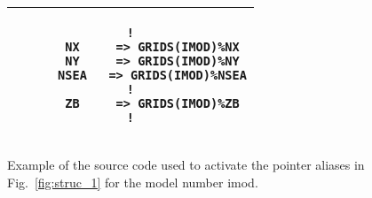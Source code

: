 \begin{figure}
\begin{center} \begin{tabular}{|c|} \hline
\begin{minipage}[t]{4.5in}
\begin{verbatim}
!
      NX     => GRIDS(IMOD)%NX
      NY     => GRIDS(IMOD)%NY
      NSEA   => GRIDS(IMOD)%NSEA
!
      ZB     => GRIDS(IMOD)%ZB
!
\end{verbatim}
\end{minipage} \\ \hline
\end{tabular} \end{center}

\caption{Example of the source code used to activate the pointer
         aliases in Fig.~\ref{fig:struc_1} for the model number {\F
         imod}.}
\label{fig:struc_2}

\botline
\end{figure}
